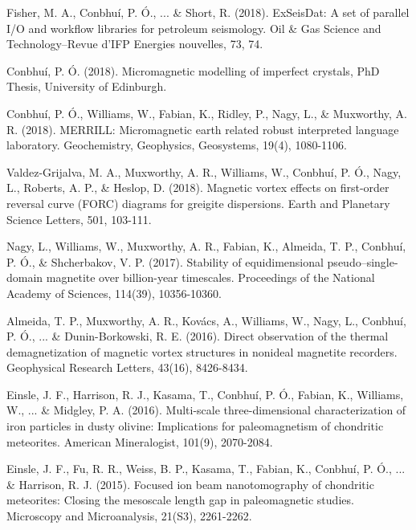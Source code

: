 \documentclass[11pt]{article}
\newenvironment{resumeSubSectionBody}{
    \par
    \vspace{-0.4\parskip}
    \begin{small}
    \par
} {
    \par
    \end{small}
    \par
}
\begin{document}
%
%
\begin{resumeSubSectionBody}

    Fisher, M. A., Conbhuí, P. Ó., ... {\&} Short, R. (2018). ExSeisDat: A set of parallel I/O and
    workflow libraries for petroleum seismology. Oil {\&} Gas Science and
    Technology–Revue d’IFP Energies nouvelles, 73, 74.

    Conbhuí, P. Ó. (2018). Micromagnetic modelling of imperfect crystals, PhD
    Thesis, University of Edinburgh.

    Conbhuí, P. Ó., Williams, W., Fabian, K., Ridley, P., Nagy, L., {\&}
    Muxworthy, A. R. (2018). MERRILL: Micromagnetic earth related robust
    interpreted language laboratory. Geochemistry, Geophysics, Geosystems,
    19(4), 1080-1106.

    Valdez-Grijalva, M. A., Muxworthy, A. R., Williams, W., Conbhuí, P. Ó.,
    Nagy, L., Roberts, A. P., {\&} Heslop, D. (2018). Magnetic vortex effects on
    first-order reversal curve (FORC) diagrams for greigite dispersions. Earth
    and Planetary Science Letters, 501, 103-111.

    Nagy, L., Williams, W., Muxworthy, A. R., Fabian, K., Almeida, T. P.,
    Conbhuí, P. Ó., {\&} Shcherbakov, V. P. (2017). Stability of equidimensional
    pseudo–single-domain magnetite over billion-year timescales. Proceedings of
    the National Academy of Sciences, 114(39), 10356-10360.

    Almeida, T. P., Muxworthy, A. R., Kov\'acs, A., Williams, W., Nagy, L.,
    Conbhu\'i, P. \'O., ... {\&} Dunin-Borkowski, R. E. (2016). Direct
    observation of the thermal demagnetization of magnetic vortex structures in
    nonideal magnetite recorders. Geophysical Research Letters, 43(16),
    8426-8434.

    Einsle, J. F., Harrison, R. J., Kasama, T., Conbhu\'i, P. \'O., Fabian, K.,
    Williams, W., ... {\&} Midgley, P. A. (2016). Multi-scale three-dimensional
    characterization of iron particles in dusty olivine: Implications for
    paleomagnetism of chondritic meteorites. American Mineralogist, 101(9),
    2070-2084.

    Einsle, J. F., Fu, R. R., Weiss, B. P., Kasama, T., Fabian, K., Conbhu\'i,
    P.  \'O., ... {\&} Harrison, R. J. (2015). Focused ion beam nanotomography
    of chondritic meteorites: Closing the mesoscale length gap in paleomagnetic
    studies. Microscopy and Microanalysis, 21(S3), 2261-2262.

\end{resumeSubSectionBody}


\end{document}
